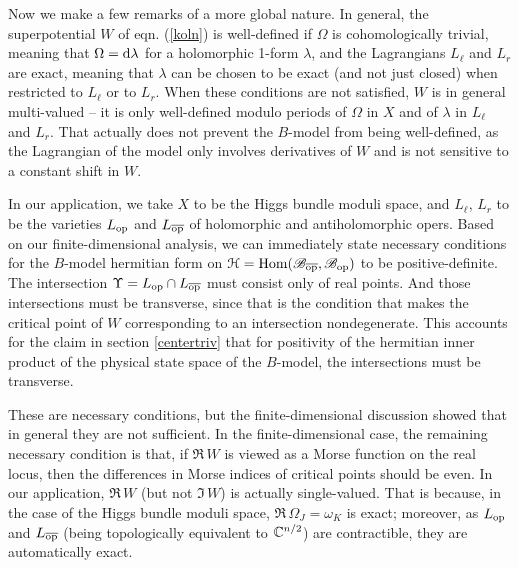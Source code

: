 \documentclass[11pt,a4paper]{article}
\begin{document}
 Now we make a few remarks of a more global nature.
 In general, the superpotential $W$ of eqn. (\ref{koln}) is well-defined
if $\Omega$ is cohomologically trivial, meaning that $\Omega=\mathrm d \lambda$ for a holomorphic 1-form $\lambda$, and the Lagrangians $L_\ell$ and $L_r$
are exact, meaning that $\lambda$ can be chosen to be exact (and not just closed) when restricted to $L_\ell$ or to $L_r$.   When these conditions    are not satisfied,
$W$ is in general multi-valued -- it is only well-defined modulo periods of $\Omega$ in $X$ and of $\lambda$ in $L_\ell$ and $L_r$.   That actually does not prevent the
$B$-model from being well-defined, as the Lagrangian of the model only involves derivatives of $W$ and is not sensitive to a constant shift in $W$.
 

 In our application, we take $X$ to be the Higgs bundle moduli space, and $L_\ell$, $L_r$ to be the varieties $L_{\mathrm{op}}$ and $L_{\overline{\mathrm{op}}}$ of holomorphic
 and antiholomorphic opers.   Based on our finite-dimensional analysis, we can immediately state necessary conditions for the $B$-model hermitian 
 form on ${\mathcal H}={\mathrm{Hom}}({\mathscr B}_{\overline{\mathrm{op}}},{\mathscr B}_{\mathrm{op}})$  to be positive-definite.   The intersection $\Upsilon=L_{\mathrm{op}}\cap L_{\overline{\mathrm{op}}}$ must consist only of real points.  And those intersections
 must be transverse, since that is the condition that makes the critical point of $W$ corresponding to an intersection nondegenerate.   This accounts
for   the claim  in section   \ref{centertriv} that  for positivity of the hermitian inner product of the physical state
space of  the $B$-model, the intersections must be transverse.

These are necessary conditions, but the finite-dimensional discussion showed that in general they are not sufficient.   In the finite-dimensional case,
the remaining necessary condition is that, if $\Re\,W$ is viewed as a Morse function on the real locus, then the differences in Morse indices of critical
points should be even.   In our application, $\Re\,W$ (but not $\Im\,W$) is actually single-valued.   That is because, in the case of the Higgs bundle
moduli space, $\Re\,\Omega_J=\omega_K$ is exact; moreover, as $L_{\mathrm{op}}$ and $L_{\overline{\mathrm{op}}}$ (being topologically equivalent to ${\mathbb C}^{n/2}$)
are contractible, they are automatically exact.   
\end{document}
